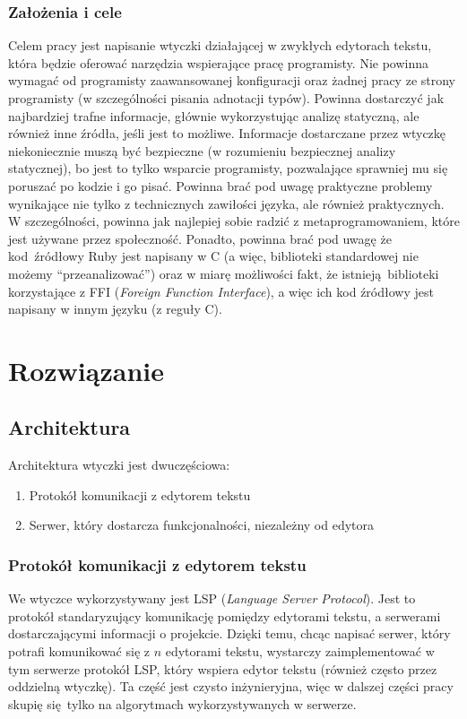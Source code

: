 \documentclass[declaration,shortabstract]{iithesis}
\begin{document}
\subsection{Założenia i cele}

Celem pracy jest napisanie wtyczki działającej w zwykłych edytorach tekstu, która będzie oferować narzędzia wspierające pracę programisty.
Nie powinna wymagać od programisty zaawansowanej konfiguracji oraz żadnej pracy ze strony programisty (w szczególności pisania adnotacji typów).
Powinna dostarczyć jak najbardziej trafne informacje, głównie wykorzystując analizę statyczną, ale również inne źródła, jeśli jest to możliwe.
Informacje dostarczane przez wtyczkę niekoniecznie muszą być bezpieczne (w rozumieniu bezpiecznej analizy statycznej), bo jest to tylko wsparcie programisty, pozwalające sprawniej mu się poruszać po kodzie i go pisać.
Powinna brać pod uwagę praktyczne problemy wynikające nie tylko z technicznych zawiłości języka, ale również praktycznych.
W szczególności, powinna jak najlepiej sobie radzić z metaprogramowaniem, które jest używane przez społeczność.
Ponadto, powinna brać pod uwagę że kod źródłowy Ruby jest napisany w C (a więc, biblioteki standardowej nie możemy ``przeanalizować'') oraz w miarę możliwości fakt, że istnieją biblioteki korzystające z FFI (\textit{Foreign Function Interface}), a więc ich kod źródłowy jest napisany w innym języku (z reguły C).

\chapter{Rozwiązanie}

\section{Architektura}

Architektura wtyczki jest dwuczęściowa:
\begin{enumerate}
\item Protokół komunikacji z edytorem tekstu
\item Serwer, który dostarcza funkcjonalności, niezależny od edytora
\end{enumerate}

\subsection{Protokół komunikacji z edytorem tekstu}

We wtyczce wykorzystywany jest LSP (\textit{Language Server Protocol}).
Jest to protokół standaryzujący komunikację pomiędzy edytorami tekstu, a serwerami dostarczającymi informacji o projekcie.
Dzięki temu, chcąc napisać serwer, który potrafi komunikować się z $n$ edytorami tekstu, wystarczy zaimplementować w tym serwerze protokół LSP, który wspiera edytor tekstu (również często przez oddzielną wtyczkę). Ta część jest czysto inżynieryjna, więc w dalszej części pracy skupię się tylko na algorytmach wykorzystywanych w serwerze.
\end{document}
